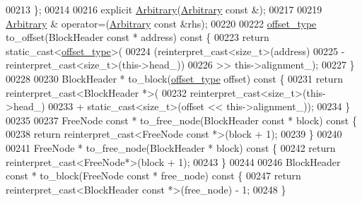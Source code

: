 \begin{DoxyCode}
00213     \};
00214 
00216     \textcolor{keyword}{explicit} \hyperlink{classhryky_1_1memory_1_1heap_1_1_arbitrary_aea108b28a19e3cd537c4c02bc4d032e0}{Arbitrary}(\hyperlink{classhryky_1_1memory_1_1heap_1_1_arbitrary_aea108b28a19e3cd537c4c02bc4d032e0}{Arbitrary} \textcolor{keyword}{const} &);
00217 
00219     \hyperlink{classhryky_1_1memory_1_1heap_1_1_arbitrary_aea108b28a19e3cd537c4c02bc4d032e0}{Arbitrary} & operator=(\hyperlink{classhryky_1_1memory_1_1heap_1_1_arbitrary_aea108b28a19e3cd537c4c02bc4d032e0}{Arbitrary} \textcolor{keyword}{const} &rhs);
00220 
00222     \hyperlink{classhryky_1_1memory_1_1heap_1_1_arbitrary_a93027662f345b66e738ce8b2c9293e94}{offset_type} to\_offset(BlockHeader \textcolor{keyword}{const} * address)\textcolor{keyword}{ const }\{
00223         \textcolor{keywordflow}{return} \textcolor{keyword}{static\_cast<}\hyperlink{classhryky_1_1memory_1_1heap_1_1_arbitrary_a93027662f345b66e738ce8b2c9293e94}{offset_type}\textcolor{keyword}{>}(
00224             (\textcolor{keyword}{reinterpret\_cast<}\textcolor{keywordtype}{size\_t}\textcolor{keyword}{>}(address)
00225              - reinterpret\_cast<size\_t>(this->head\_))
00226             >> this->alignment\_);
00227     \}
00228 
00230     BlockHeader * to\_block(\hyperlink{classhryky_1_1memory_1_1heap_1_1_arbitrary_a93027662f345b66e738ce8b2c9293e94}{offset_type} offset)\textcolor{keyword}{ const }\{
00231         \textcolor{keywordflow}{return} \textcolor{keyword}{reinterpret\_cast<}BlockHeader *\textcolor{keyword}{>}(
00232             \textcolor{keyword}{reinterpret\_cast<}\textcolor{keywordtype}{size\_t}\textcolor{keyword}{>}(this->head\_)
00233             + static\_cast<size\_t>(offset << this->alignment\_));
00234     \}
00235 
00237     FreeNode \textcolor{keyword}{const} * to\_free\_node(BlockHeader \textcolor{keyword}{const} * block)\textcolor{keyword}{ const }\{
00238         \textcolor{keywordflow}{return} \textcolor{keyword}{reinterpret\_cast<}FreeNode \textcolor{keyword}{const }*\textcolor{keyword}{>}(block + 1);
00239     \}
00240  
00241     FreeNode * to\_free\_node(BlockHeader * block)\textcolor{keyword}{ const }\{
00242         \textcolor{keywordflow}{return} \textcolor{keyword}{reinterpret\_cast<}FreeNode*\textcolor{keyword}{>}(block + 1);
00243     \}
00244 
00246     BlockHeader \textcolor{keyword}{const} * to\_block(FreeNode \textcolor{keyword}{const} * free\_node)\textcolor{keyword}{ const }\{
00247         \textcolor{keywordflow}{return} \textcolor{keyword}{reinterpret\_cast<}BlockHeader \textcolor{keyword}{const }*\textcolor{keyword}{>}(free\_node) - 1;
00248     \}

\end{DoxyCode}
